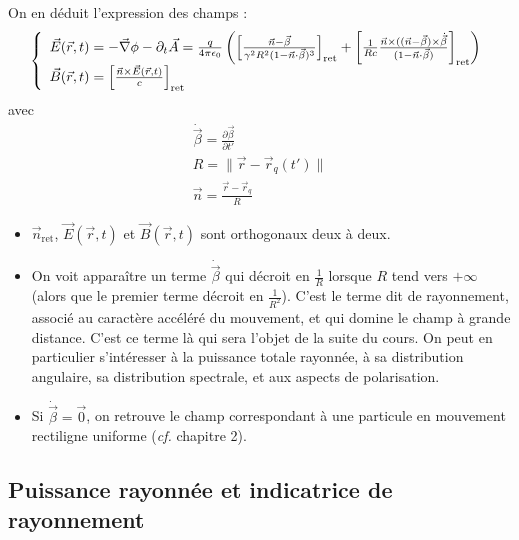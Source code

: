 On en déduit l'expression des champs :
$$
	\left\{\begin{array}{r@{\;}l}
		\vec{E}(\vec{r},t)&=-\nab\phi-\partial_t\vec{A}=
			\frac{q}{4\pi\epsilon_0}\left(\left[\frac{\vec{n}-\vec{\beta}}{\gamma^2R^2(1-\vec{n}\cdot\vec{\beta})^3}\right]_{\text{ret}}+
			\left[\frac{1}{Rc}\frac{\vec{n}\times((\vec{n}-\vec{\beta})\times\dot{\vec{\beta}}}{(1-\vec{n}\cdot\vec{\beta})}\right]_{\text{ret}}\right)\\
		\vec{B}(\vec{r},t)&=\left[\frac{\vec{n}\times\vec{E}(\vec{r},t)}{c}\right]_{\text{ret}}
	\end{array}\right.
$$
avec
$$
	\begin{array}{l}
		\dot{\vec{\beta}}=\frac{\partial\vec{\beta}}{\partial t'}\\
		R=\|\vec{r}-\vec{r}_q(t')\|\\
		\vec{n}=\frac{\vec{r}-\vec{r}_q}{R}	
	\end{array}
$$

\begin{remarks}\hspace*{1em}
\begin{itemize} \txt
	\item $\vec{n}_{\text{ret}}$, $\vec{E}(\vec{r},t)$ et $\vec{B}(\vec{r},t)$ sont orthogonaux deux à deux.
	 \item On voit apparaître un terme $\dot{\vec{\beta}}$ qui décroit en $\frac{1}{R}$ lorsque $R$ tend vers $+\infty$ (alors que le premier terme décroit en $\frac{1}{R^2}$). C'est le terme dit de rayonnement, associé au caractère accéléré du mouvement, et qui domine le champ à grande distance. C'est ce terme là qui sera l'objet de la suite du cours. On peut en particulier s'intéresser à la puissance totale rayonnée, à sa distribution angulaire, sa distribution spectrale, et aux aspects de polarisation.
	 \item Si $\dot{\vec{\beta}}=\vec{0}$, on retrouve le champ correspondant à une particule en mouvement rectiligne uniforme (\emph{cf.} chapitre 2).
\end{itemize}
\end{remarks}

\subsection{Puissance rayonnée et indicatrice de rayonnement}
